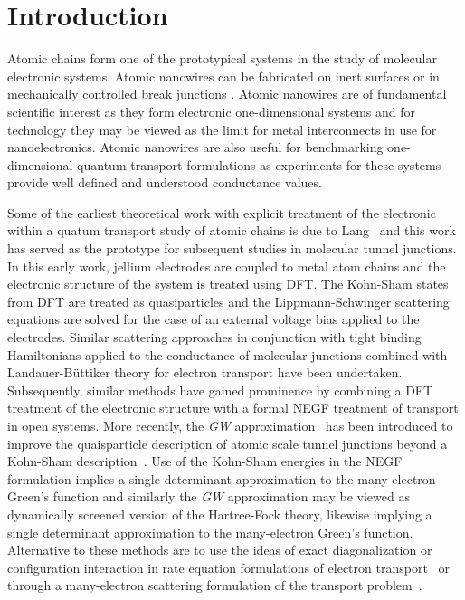 \section{Introduction}

Atomic chains form one of the prototypical systems in the study of
molecular electronic systems. Atomic nanowires can be fabricated on
inert surfaces \cite{segovia1999nature,nilius2002science} or in
mechanically controlled break junctions \cite{vanruitenbeek1998mcbj}.
Atomic nanowires are of fundamental scientific interest as they form
electronic one-dimensional systems and for technology they may be viewed
as the limit for metal interconnects in use for nanoelectronics.  Atomic
nanowires are also useful for benchmarking one-dimensional quantum
transport formulations as experiments for these systems provide well
defined and understood conductance values.

Some of the earliest theoretical work with explicit treatment of the
electronic within a quatum transport study of atomic chains is due to
Lang~\cite{Lang1995prb} and this work has served as the prototype for
subsequent studies in molecular tunnel junctions. In this early work,
jellium electrodes are coupled to metal atom chains and the electronic
structure of the system is treated using \ac{DFT}. The Kohn-Sham states
from \ac{DFT} are treated as quasiparticles and the Lippmann-Schwinger
scattering equations are solved for the case of an external voltage bias
applied to the electrodes. Similar scattering approaches in conjunction
with tight binding Hamiltonians applied to the conductance of molecular
junctions combined with Landauer-B\"uttiker theory for electron transport
\cite{emberlykirczenow1999standingwave,
emberlykirczenow2000molecularwire} have been undertaken. 
Subsequently, similar methods have gained prominence by combining a \ac{DFT}
treatment of the electronic structure with a formal \ac{NEGF} treatment of
transport in open systems. More recently, the {\it GW}
approximation~\cite{hedin1965gw} has been introduced to improve  the
quaisparticle description of atomic scale tunnel junctions beyond a Kohn-Sham
description~\cite{thygesen_rubio,neaton2007amines}.  Use of the
Kohn-Sham energies in the NEGF formulation implies a single determinant
approximation to the many-electron Green's function and similarly the
{\it GW} approximation may be viewed as dynamically screened version of
the Hartree-Fock theory, likewise implying a single determinant
approximation to the many-electron Green's function.  Alternative to
these methods are to use the ideas of exact diagonalization or
configuration interaction in rate equation formulations of electron
transport~\cite{pedersen_many_body_tunneling} or through a many-electron
scattering formulation of the transport problem~\cite{vici2004}. 

